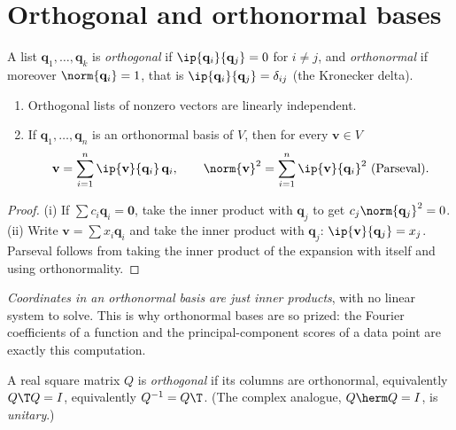 \section{Orthogonal and orthonormal bases}

\begin{definition}
A list $\mathbf{q}_1,\dots,\mathbf{q}_k$ is \emph{orthogonal} if $\ip{\mathbf{q}_i}{\mathbf{q}_j}=0$ for $i\ne j$, and \emph{orthonormal} if moreover $\norm{\mathbf{q}_i}=1$, that is $\ip{\mathbf{q}_i}{\mathbf{q}_j}=\delta_{ij}$ (the Kronecker delta).
\end{definition}

\begin{theorem}\label{thm:orthocoord}
\begin{enumerate}[label=(\roman*)]
  \item Orthogonal lists of nonzero vectors are linearly independent.
  \item If $\mathbf{q}_1,\dots,\mathbf{q}_n$ is an orthonormal basis of $V$, then for every $\mathbf{v}\in V$
  \[ \mathbf{v}=\sum_{i=1}^n\ip{\mathbf{v}}{\mathbf{q}_i}\,\mathbf{q}_i,\qquad\norm{\mathbf{v}}^2=\sum_{i=1}^n\ip{\mathbf{v}}{\mathbf{q}_i}^2\ \text{(Parseval)}. \]
\end{enumerate}
\end{theorem}

\begin{proof}
(i) If $\sum c_i\mathbf{q}_i=\mathbf{0}$, take the inner product with $\mathbf{q}_j$ to get $c_j\norm{\mathbf{q}_j}^2=0$. (ii) Write $\mathbf{v}=\sum x_i\mathbf{q}_i$ and take the inner product with $\mathbf{q}_j$: $\ip{\mathbf{v}}{\mathbf{q}_j}=x_j$. Parseval follows from taking the inner product of the expansion with itself and using orthonormality.
\end{proof}

\emph{Coordinates in an orthonormal basis are just inner products}, with no linear system to solve. This is why orthonormal bases are so prized: the Fourier coefficients of a function and the principal-component scores of a data point are exactly this computation.

\begin{definition}
A real square matrix $Q$ is \emph{orthogonal} if its columns are orthonormal, equivalently $Q\T Q=I$, equivalently $Q^{-1}=Q\T$. (The complex analogue, $Q\herm Q=I$, is \emph{unitary}.)
\end{definition}

